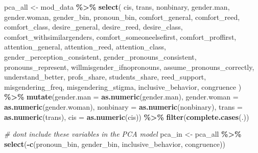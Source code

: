\documentclass[12pt,twoside]{reedthesis}
\newenvironment{Shaded}{\begin{snugshade}}{\end{snugshade}}
\newcommand{\CommentTok}[1]{\textcolor[rgb]{0.56,0.35,0.01}{\textit{#1}}}
\newcommand{\DataTypeTok}[1]{\textcolor[rgb]{0.13,0.29,0.53}{#1}}
\newcommand{\KeywordTok}[1]{\textcolor[rgb]{0.13,0.29,0.53}{\textbf{#1}}}
\newcommand{\NormalTok}[1]{#1}
\newcommand{\OperatorTok}[1]{\textcolor[rgb]{0.81,0.36,0.00}{\textbf{#1}}}
\newcommand{\StringTok}[1]{\textcolor[rgb]{0.31,0.60,0.02}{#1}}
\begin{document}
\begin{Shaded}
\begin{Highlighting}[]
\NormalTok{pca\_all \textless{}{-}}\StringTok{ }\NormalTok{mod\_data }\OperatorTok{\%\textgreater{}\%}
\StringTok{  }\KeywordTok{select}\NormalTok{(}
\NormalTok{    cis,}
\NormalTok{    trans,}
\NormalTok{    nonbinary,}
\NormalTok{    gender.man,}
\NormalTok{    gender.woman,}
\NormalTok{    gender\_bin,}
\NormalTok{    pronoun\_bin,}
\NormalTok{    comfort\_general,}
\NormalTok{    comfort\_reed,}
\NormalTok{    comfort\_class,}
\NormalTok{    desire\_general,}
\NormalTok{    desire\_reed,}
\NormalTok{    desire\_class,}
\NormalTok{    comfort\_withsimilargenders,}
\NormalTok{    comfort\_someoneelsefirst,}
\NormalTok{    comfort\_proffirst,}
\NormalTok{    attention\_general,}
\NormalTok{    attention\_reed,}
\NormalTok{    attention\_class,}
\NormalTok{    gender\_perception\_consistent,}
\NormalTok{    gender\_pronouns\_consistent,}
\NormalTok{    pronouns\_represent,}
\NormalTok{    willmisgender\_ifnopronouns,}
\NormalTok{    assume\_pronouns\_correctly,}
\NormalTok{    understand\_better,}
\NormalTok{    profs\_share,}
\NormalTok{    students\_share,}
\NormalTok{    reed\_support,}
\NormalTok{    misgendering\_freq,}
\NormalTok{    misgendering\_stigma,}
\NormalTok{    inclusive\_behavior,}
\NormalTok{    congruence}
\NormalTok{    ) }\OperatorTok{\%\textgreater{}\%}
\StringTok{  }\KeywordTok{mutate}\NormalTok{(}\DataTypeTok{gender.man =} \KeywordTok{as.numeric}\NormalTok{(gender.man), }\DataTypeTok{gender.woman =} \KeywordTok{as.numeric}\NormalTok{(gender.woman), }\DataTypeTok{nonbinary =} \KeywordTok{as.numeric}\NormalTok{(nonbinary), }\DataTypeTok{trans =} \KeywordTok{as.numeric}\NormalTok{(trans), }\DataTypeTok{cis =} \KeywordTok{as.numeric}\NormalTok{(cis)) }\OperatorTok{\%\textgreater{}\%}
\StringTok{  }\KeywordTok{filter}\NormalTok{(}\KeywordTok{complete.cases}\NormalTok{(.))}

\CommentTok{\# don\textquotesingle{}t include these variables in the PCA model}
\NormalTok{pca\_in \textless{}{-}}\StringTok{ }\NormalTok{pca\_all }\OperatorTok{\%\textgreater{}\%}\StringTok{ }\KeywordTok{select}\NormalTok{(}\OperatorTok{{-}}\KeywordTok{c}\NormalTok{(pronoun\_bin, gender\_bin, inclusive\_behavior, congruence))}


\end{Highlighting}
\end{Shaded}
\end{document}
